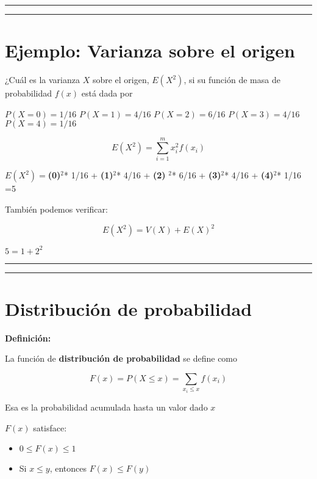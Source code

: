 \documentclass[
]{book}
\providecommand{\tightlist}{%
  \setlength{\itemsep}{0pt}\setlength{\parskip}{0pt}}
\begin{document}
\begin{center}\rule{0.5\linewidth}{0.5pt}\end{center}

\begin{center}\rule{0.5\linewidth}{0.5pt}\end{center}

\hypertarget{ejemplo-varianza-sobre-el-origen}{%
\section{Ejemplo: Varianza sobre el origen}\label{ejemplo-varianza-sobre-el-origen}}

¿Cuál es la varianza \(X\) sobre el origen, \(E(X^2)\), si su función de masa de probabilidad \(f(x)\) está dada por

\(P(X=0)=1/16\)
\(P(X=1)=4/16\)
\(P(X=2)=6/16\)
\(P(X=3)=4/16\)
\(P(X=4)=1/16\)

\[E(X^2) =\sum_{i=1}^m x_i^2 f(x_i)\]

\(E(X^2)=\)\textbf{(0)}\(^2\)* 1/16 + \textbf{(1)}\(^2\)* 4/16 + \textbf{(2)} \(^2\)* 6/16 + \textbf{(3)}\(^2\)* 4/16 + \textbf{(4)}\(^2\)* 1/16 =5

También podemos verificar:

\[E(X^2)=V(X)+E(X)^2\]

\(5=1+2^2\)

\begin{center}\rule{0.5\linewidth}{0.5pt}\end{center}

\begin{center}\rule{0.5\linewidth}{0.5pt}\end{center}

\hypertarget{distribuciuxf3n-de-probabilidad}{%
\section{Distribución de probabilidad}\label{distribuciuxf3n-de-probabilidad}}

\textbf{Definición:}

La función de \textbf{distribución de probabilidad} se define como

\[F(x)=P(X\leq x)=\sum_{x_i\leq x} f(x_i) \]

Esa es la probabilidad acumulada hasta un valor dado \(x\)

\(F(x)\) satisface:

\begin{itemize}
\tightlist
\item
  \(0\leq F(x) \leq 1\)
\item
  Si \(x \leq y\), entonces \(F(x) \leq F(y)\)
\end{itemize}
\end{document}
